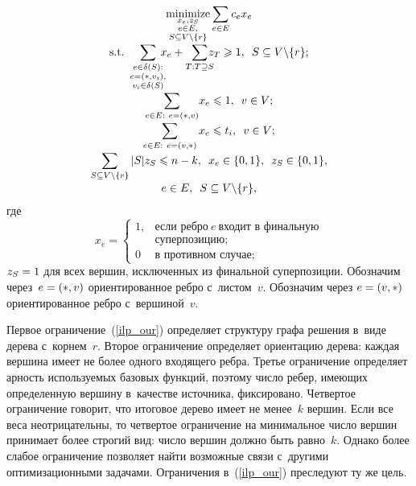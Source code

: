 \begin{multicols}{2}
\noindent
\begin{multline}
\underset{\substack{{x_e, z_S} \\ e\in E,\\ S\subseteq V\backslash 
\{r\}}}{\mbox{minimize}}  \displaystyle \sum\limits_{e\in E}c_ex_e \\[-3pt]
\mbox{s.t.}\  \displaystyle  \sum\limits_{\substack{{e\in\delta(S):}\\ e=(\ast,v_i),\\ v_i\in\delta(S)}} \!\!\!\! x_e + 
\sum\limits_{T:T\supseteq S}  \!\!\!\! z_T\geqslant 1,\enskip  S\subseteq 
V\backslash \{r\};\\[-3pt]
 \displaystyle \sum\limits_{e\in E:~e=(\ast,v)} \! x_e\leqslant 1,\enskip v\in V;\\[-3pt]
 \displaystyle \sum\limits_{e\in E:~e=(v,\ast)}x_e\leqslant t_i,\enskip  v\in V;\\[-3pt]
 \displaystyle \sum\limits_{S\subseteq V\backslash \{r\}}|S|z_S \leqslant n-k,\enskip  x_e\in\{0,1\},\enskip 
 z_S\in\{0,1\},\\[-3pt]
  e\in E,\enskip   S\subseteq V\backslash \{r\},
\label{ilp_our}
\end{multline}
где
$$
x_e =\begin{cases}
 1, &\mbox{если\ ребро}\ e\ \mbox{входит\ в~финальную}\\
 &\mbox{суперпозицию};\\
 0 & \mbox{в~противном\ случае};
 \end{cases}
 $$
  $z_S\hm = 1$ для всех вершин, исключенных из финальной 
суперпозиции. Обозначим через~$e\hm=(\ast, v)$ ориентированное ребро с~листом~$v$. 
Обозначим через $e\hm=(v, \ast)$ ориентированное ребро с~вершиной~$v$.

Первое ограничение~(\ref{ilp_our})  определяет структуру графа решения в~виде 
дерева с~корнем~$r$. Второе ограничение определяет ориентацию дерева: каждая 
вершина имеет не более одного входящего ребра. Третье ограничение определяет 
арность используемых базовых функций, поэтому число ребер, имеющих определенную 
вершину в~качестве источника, фиксировано. Четвертое ограничение говорит, что 
итоговое дерево имеет не менее~$k$ вершин. Если все веса неотрицательны, то 
четвертое ограничение на минимальное число вершин принимает более строгий вид: 
число вершин должно быть равно~$k$. Однако более слабое ограничение позволяет 
найти возможные связи с~другими оптимизационными задачами. Ограничения 
в~(\ref{ilp_our}) преследуют ту же цель.

\vspace*{-9pt}


\end{multicols}
